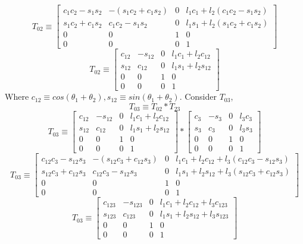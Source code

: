\documentclass[12pt]{article}
\begin{document}
\[
  T_{02} \equiv
  \begin{bmatrix} c_1c_2 - s_1s_2 & -(s_1c_2 + c_1s_2) & 0 & l_1c_1 + l_2(c_1c_2 - s_1s_2) \\ s_1c_2 + c_1s_2 & c_1c_2 - s_1s_2 & 0 & l_1s_1 + l_2(s_1c_2 + c_1s_2) \\ 0 & 0 & 1 & 0 \\ 0 & 0 & 0 & 1 \end{bmatrix}
\]
\[
  T_{02} \equiv
  \begin{bmatrix} c_{12} & -s_{12} & 0 & l_1c_1 + l_2c_{12} \\ s_{12} & c_{12} & 0 & l_1s_1 + l_2s_{12} \\ 0 & 0 & 1 & 0 \\ 0 & 0 & 0 & 1 \end{bmatrix}
\]
Where $c_{12} \equiv cos(\theta_1 + \theta_2), s_{12} \equiv sin(\theta_1 + \theta_2)$.
Consider $T_{03}$,
\[
  T_{03} \equiv T_{02} * T_{23}
\]
\[
  T_{03} \equiv
  \begin{bmatrix} c_{12} & -s_{12} & 0 & l_1c_1 + l_2c_{12} \\ s_{12} & c_{12} & 0 & l_1s_1 + l_2s_{12} \\ 0 & 0 & 1 & 0 \\ 0 & 0 & 0 & 1 \end{bmatrix}
  *
  \begin{bmatrix} c_3 & -s_3 & 0 & l_3c_3 \\ s_3 & c_3 & 0 & l_3s_3 \\ 0 & 0 & 1 & 0 \\ 0 & 0 & 0 & 1 \end{bmatrix}
\]
\[
  T_{03} \equiv
  \begin{bmatrix}
    c_{12}c_{3} - s_{12}s_{3} & -(s_{12}c_{3} + c_{12}s_{3}) & 0 & l_1c_1 + l_2c_{12} + l_3(c_{12}c_{3} - s_{12}s_{3})\\
    s_{12}c_{3} + c_{12}s_{3} & c_{12}c_{3} - s_{12}s_{3}    & 0 & l_1s_1 + l_2s_{12} + l_3(s_{12}c_{3} + c_{12}s_{3})\\
    0 & 0 & 1 & 0 \\
    0 & 0 & 0 & 1
  \end{bmatrix}
\]
\[
  T_{03} \equiv
  \begin{bmatrix}
    c_{123} & -s_{123} & 0 & l_1c_1 + l_2c_{12} + l_3c_{123}\\
    s_{123} & c_{123}  & 0 & l_1s_1 + l_2s_{12} + l_3s_{123}\\
    0 & 0 & 1 & 0 \\
    0 & 0 & 0 & 1
  \end{bmatrix}
\]
\end{document}
